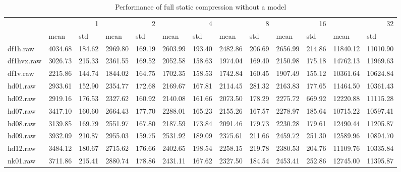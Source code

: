\begin{table}
\caption{Performance of full static compression without a model}
\begin{tabular}{lllllllllllll}
 & \multicolumn{2}{r}{1} & \multicolumn{2}{r}{2} & \multicolumn{2}{r}{4} & \multicolumn{2}{r}{8} & \multicolumn{2}{r}{16} & \multicolumn{2}{r}{32} \\
 & mean & std & mean & std & mean & std & mean & std & mean & std & mean & std \\
df1h.raw & 4034.68 & 184.62 & 2969.80 & 169.19 & 2603.99 & 193.40 & 2482.86 & 206.69 & 2656.99 & 214.86 & 11840.12 & 11010.90 \\
df1hvx.raw & 3026.73 & 215.33 & 2361.55 & 169.52 & 2052.58 & 158.63 & 1974.04 & 169.40 & 2150.98 & 175.18 & 14762.13 & 11969.63 \\
df1v.raw & 2215.86 & 144.74 & 1844.02 & 164.75 & 1702.35 & 158.53 & 1742.84 & 160.45 & 1907.49 & 155.12 & 10361.64 & 10624.84 \\
hd01.raw & 2933.61 & 152.90 & 2354.77 & 172.68 & 2169.67 & 167.81 & 2114.45 & 281.32 & 2163.83 & 177.65 & 11464.50 & 10361.43 \\
hd02.raw & 2919.16 & 176.53 & 2327.62 & 160.92 & 2140.08 & 161.66 & 2073.50 & 178.29 & 2275.72 & 669.92 & 12220.88 & 11115.28 \\
hd07.raw & 3417.10 & 160.60 & 2664.43 & 177.70 & 2288.01 & 165.23 & 2155.26 & 167.57 & 2278.97 & 185.64 & 10715.22 & 10597.41 \\
hd08.raw & 3139.85 & 169.79 & 2551.97 & 167.80 & 2187.59 & 173.84 & 2091.46 & 179.73 & 2230.28 & 179.61 & 12490.44 & 11205.87 \\
hd09.raw & 3932.09 & 210.87 & 2955.03 & 159.75 & 2531.92 & 189.09 & 2375.61 & 211.66 & 2459.72 & 251.30 & 12589.96 & 10894.70 \\
hd12.raw & 3484.12 & 180.67 & 2715.62 & 176.66 & 2402.65 & 198.54 & 2258.15 & 219.78 & 2380.53 & 204.76 & 11109.76 & 10335.84 \\
nk01.raw & 3711.86 & 215.41 & 2880.74 & 178.86 & 2431.11 & 167.62 & 2327.50 & 184.54 & 2453.41 & 252.86 & 12745.00 & 11395.87 \\
\end{tabular}
\end{table}
